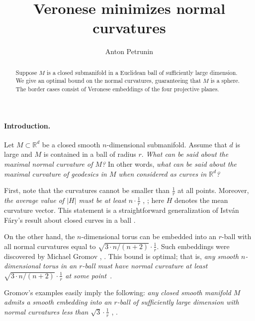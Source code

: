 \documentclass[a4paper,10pt]{article}
\def\thetitle{Veronese minimizes normal curvatures}
\def\theauthors{Anton Petrunin}
\begin{document}


\title{\thetitle}
\author{\theauthors
{}}
\date{}
\maketitle

\begin{abstract}
Suppose \( M \) is a closed submanifold in a Euclidean ball of sufficiently large dimension.
We give an optimal bound on the normal curvatures, guaranteeing that \( M \) is a sphere.
The border cases consist of Veronese embeddings of the four projective planes.
\end{abstract}

\paragraph{Introduction.}
Let \( M \subset \mathbb{R}^d \) be a closed smooth \( n \)-dimensional submanifold.
Assume that \( d \) is large and \( M \) is contained in a ball of radius \( r \).
\textit{What can be said about the maximal normal curvature of \( M \)?}
In other words, \textit{what can be said about the maximal curvature of geodesics in \( M \) when considered as curves in \( \mathbb{R}^d \)?}

First, note that the curvatures cannot be smaller than \( \tfrac{1}{r} \) at all points.
Moreover,
\textit{the average value of \( |H| \) must be at least \( n \cdot \tfrac{1}{r} \)} \cite[28.2.5]{burago-zalgaller}, \cite[3.1]{petrunin2024a};
here \( H \) denotes the mean curvature vector.
This statement is a straightforward generalization of István Fáry's result about closed curves in a ball \cite{fary,tabachnikov}.

On the other hand, the \(n\)-dimensional torus can be embedded into an \(r\)-ball with all normal curvatures equal to \( \sqrt{3 \cdot n / (n + 2)} \cdot \tfrac{1}{r} \).
Such embeddings were discovered by Michael Gromov \cite[2.A]{gromov3}, \cite[1.1.A]{gromov2}.
This bound is optimal; that is, \textit{any smooth \(n\)-dimensional torus in an \(r\)-ball must have normal curvature at least \( \sqrt{3 \cdot n / (n + 2)} \cdot \tfrac{1}{r} \) at some point}~\cite{petrunin2024a}.

Gromov's examples easily imply the following:
\textit{any closed smooth manifold \( M \) admits a smooth embedding into an \(r\)-ball of sufficiently large dimension with normal curvatures less than \( \sqrt{3} \cdot \tfrac{1}{r} \)}
\cite[1.D]{gromov3}, \cite[1.1.C]{gromov2}.
\end{document}
